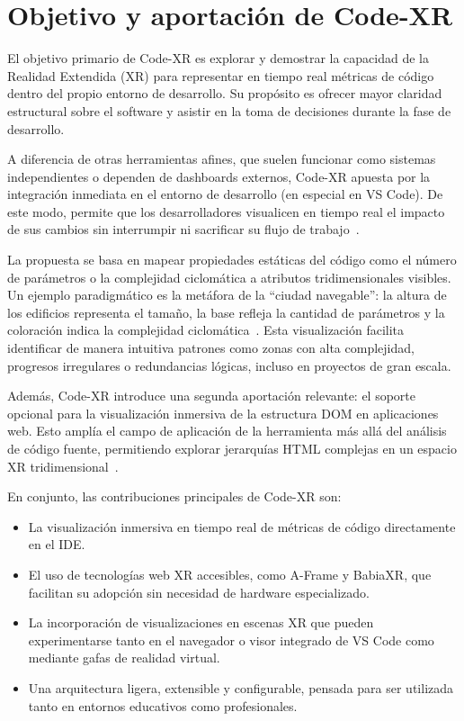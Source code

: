\documentclass[a4paper, 12pt]{book}
\begin{document}
\section{Objetivo y aportación de Code-XR}
\label{sec:objetivo}

El objetivo primario de Code-XR es explorar y demostrar la capacidad de la Realidad Extendida (XR) para representar en tiempo real métricas de código dentro del propio entorno de desarrollo. Su propósito es ofrecer mayor claridad estructural sobre el software y asistir en la toma de decisiones durante la fase de desarrollo.

A diferencia de otras herramientas afines, que suelen funcionar como sistemas independientes o dependen de dashboards externos, Code-XR apuesta por la integración inmediata en el entorno de desarrollo (en especial en VS Code). De este modo, permite que los desarrolladores visualicen en tiempo real el impacto de sus cambios sin interrumpir ni sacrificar su flujo de trabajo~\cite{wettel2007visualizing, fittkau2015exploring}.

La propuesta se basa en mapear propiedades estáticas del código como el número de parámetros o la complejidad ciclomática a atributos tridimensionales visibles. Un ejemplo paradigmático es la metáfora de la ``ciudad navegable'': la altura de los edificios representa el tamaño, la base refleja la cantidad de parámetros y la coloración indica la complejidad ciclomática~\cite{wettel2007visualizing}. Esta visualización facilita identificar de manera intuitiva patrones como zonas con alta complejidad, progresos irregulares o redundancias lógicas, incluso en proyectos de gran escala.

Además, Code-XR introduce una segunda aportación relevante: el soporte opcional para la visualización inmersiva de la estructura DOM en aplicaciones web. Esto amplía el campo de aplicación de la herramienta más allá del análisis de código fuente, permitiendo explorar jerarquías HTML complejas en un espacio XR tridimensional~\cite{moreno2024enhancing}.

En conjunto, las contribuciones principales de Code-XR son:

\begin{itemize}
    \item La visualización inmersiva en tiempo real de métricas de código directamente en el IDE.
    \item El uso de tecnologías web XR accesibles, como A-Frame y BabiaXR, que facilitan su adopción sin necesidad de hardware especializado.
    \item La incorporación de visualizaciones en escenas XR que pueden experimentarse tanto en el navegador o visor integrado de VS Code como mediante gafas de realidad virtual.
    \item Una arquitectura ligera, extensible y configurable, pensada para ser utilizada tanto en entornos educativos como profesionales.
\end{itemize}
\end{document}
